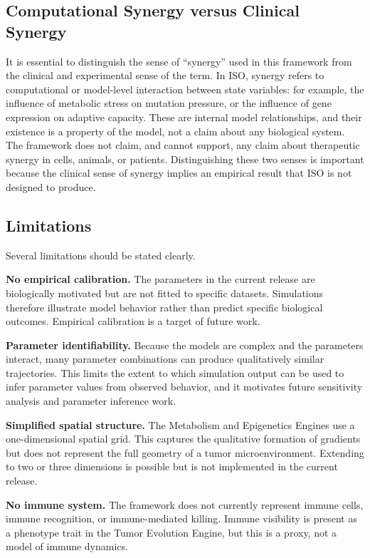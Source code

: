 \documentclass[12pt,a4paper]{article}
\begin{document}
\subsection{Computational Synergy versus Clinical Synergy}

It is essential to distinguish the sense of ``synergy'' used in this framework from the clinical and experimental sense of the term. In ISO, synergy refers to computational or model-level interaction between state variables: for example, the influence of metabolic stress on mutation pressure, or the influence of gene expression on adaptive capacity. These are internal model relationships, and their existence is a property of the model, not a claim about any biological system. The framework does not claim, and cannot support, any claim about therapeutic synergy in cells, animals, or patients. Distinguishing these two senses is important because the clinical sense of synergy implies an empirical result that ISO is not designed to produce.

\subsection{Limitations}

Several limitations should be stated clearly.

\textbf{No empirical calibration.} The parameters in the current release are biologically motivated but are not fitted to specific datasets. Simulations therefore illustrate model behavior rather than predict specific biological outcomes. Empirical calibration is a target of future work.

\textbf{Parameter identifiability.} Because the models are complex and the parameters interact, many parameter combinations can produce qualitatively similar trajectories. This limits the extent to which simulation output can be used to infer parameter values from observed behavior, and it motivates future sensitivity analysis and parameter inference work.

\textbf{Simplified spatial structure.} The Metabolism and Epigenetics Engines use a one-dimensional spatial grid. This captures the qualitative formation of gradients but does not represent the full geometry of a tumor microenvironment. Extending to two or three dimensions is possible but is not implemented in the current release.

\textbf{No immune system.} The framework does not currently represent immune cells, immune recognition, or immune-mediated killing. Immune visibility is present as a phenotype trait in the Tumor Evolution Engine, but this is a proxy, not a model of immune dynamics.
\end{document}

